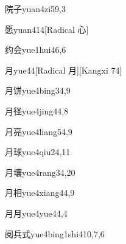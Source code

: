 \begin{verbete}{院子}{yuan4zi5}{9,3}
\end{verbete}

\begin{verbete}{愿}{yuan4}{14}[Radical 心]
\end{verbete}

\begin{verbete}{约会}{yue1hui4}{6,6}
\end{verbete}

\begin{verbete}{月}{yue4}{4}[Radical 月][Kangxi 74]
\end{verbete}

\begin{verbete}{月饼}{yue4bing3}{4,9}
\end{verbete}

\begin{verbete}{月径}{yue4jing4}{4,8}
\end{verbete}

\begin{verbete}{月亮}{yue4liang5}{4,9}
\end{verbete}

\begin{verbete}{月球}{yue4qiu2}{4,11}
\end{verbete}

\begin{verbete}{月壤}{yue4rang3}{4,20}
\end{verbete}

\begin{verbete}{月相}{yue4xiang4}{4,9}
\end{verbete}

\begin{verbete}{月月}{yue4yue4}{4,4}
\end{verbete}

\begin{verbete}{阅兵式}{yue4bing1shi4}{10,7,6}
\end{verbete}

